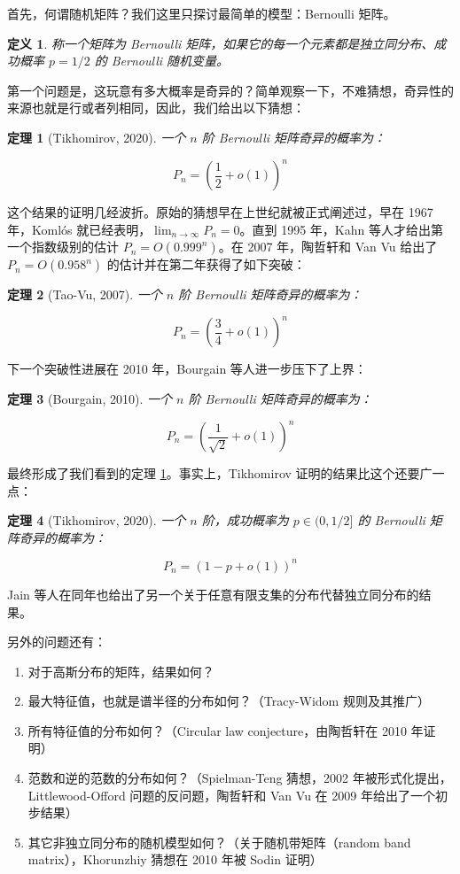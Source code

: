 \documentclass{ctexbook}
\newtheorem{definition}{定义}[chapter] %
\newtheorem{theorem}{定理}[chapter]
\begin{document}
首先，何谓随机矩阵？我们这里只探讨最简单的模型：Bernoulli 矩阵。

\begin{definition}
    称一个矩阵为 Bernoulli 矩阵，如果它的每一个元素都是独立同分布、成功概率 $p = 1/2$ 的 Bernoulli 随机变量。
\end{definition}

第一个问题是，这玩意有多大概率是奇异的？简单观察一下，不难猜想，奇异性的来源也就是行或者列相同，因此，我们给出以下猜想：

\begin{theorem}[Tikhomirov, 2020]\label{tik2020}
    一个 $n$ 阶 Bernoulli 矩阵奇异的概率为：

    $$
    P_n = \left( \frac{1}{2} + o(1) \right)^n
    $$
\end{theorem}

这个结果的证明几经波折。原始的猜想早在上世纪就被正式阐述过，早在 1967 年，Koml\'os 就已经表明，$\lim_{n \to \infty} P_n = 0$。直到 1995 年，Kahn 等人才给出第一个指数级别的估计 $P_n = O(0.999^n)$。在 2007 年，陶哲轩和 Van Vu 给出了 $P_n = O(0.958^n)$ 的估计并在第二年获得了如下突破：

\begin{theorem}[Tao-Vu, 2007]
    一个 $n$ 阶 Bernoulli 矩阵奇异的概率为：

    $$
    P_n = \left( \frac{3}{4} + o(1) \right)^n
    $$
\end{theorem}

下一个突破性进展在 2010 年，Bourgain 等人进一步压下了上界：

\begin{theorem}[Bourgain, 2010]
    一个 $n$ 阶 Bernoulli 矩阵奇异的概率为：

    $$
    P_n = \left( \frac{1}{\sqrt{2}} + o(1) \right)^n
    $$
\end{theorem}

最终形成了我们看到的定理 \ref{tik2020}。事实上，Tikhomirov 证明的结果比这个还要广一点：

\begin{theorem}[Tikhomirov, 2020]
    一个 $n$ 阶，成功概率为 $p \in (0, 1/2]$ 的 Bernoulli 矩阵奇异的概率为：

    $$
    P_n = \left( 1 - p + o(1) \right)^n
    $$
\end{theorem}

Jain 等人在同年也给出了另一个关于任意有限支集的分布代替独立同分布的结果。

另外的问题还有：

\begin{enumerate}
    \item 对于高斯分布的矩阵，结果如何？
    \item 最大特征值，也就是谱半径的分布如何？（Tracy-Widom 规则及其推广）
    \item 所有特征值的分布如何？（Circular law conjecture，由陶哲轩在 2010 年证明）
    \item 范数和逆的范数的分布如何？（Spielman-Teng 猜想，2002 年被形式化提出，Littlewood-Offord 问题的反问题，陶哲轩和 Van Vu 在 2009 年给出了一个初步结果）
    \item 其它非独立同分布的随机模型如何？（关于随机带矩阵（random band matrix），Khorunzhiy 猜想在 2010 年被 Sodin 证明）
\end{enumerate}
\end{document}
